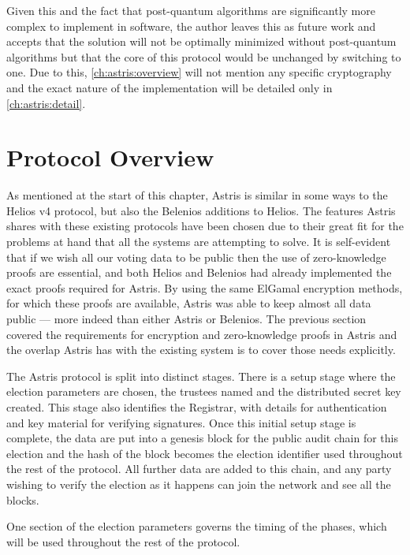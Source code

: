 Given this and the fact that post-quantum algorithms are significantly more complex to implement in software, the author leaves this as future work and accepts that the solution will not be optimally minimized without post-quantum algorithms but that the core of this protocol would be unchanged by switching to one. Due to this, \autoref{ch:astris:overview} will not mention any specific cryptography and the exact nature of the implementation will be detailed only in \autoref{ch:astris:detail}.

\section{Protocol Overview}
\label{ch:astris:overview}

As mentioned at the start of this chapter, Astris is similar in some ways to the Helios v4 protocol, but also the Belenios additions to Helios. The features Astris shares with these existing protocols have been chosen due to their great fit for the problems at hand that all the systems are attempting to solve. It is self-evident that if we wish all our voting data to be public then the use of zero-knowledge proofs are essential, and both Helios and Belenios had already implemented the exact proofs required for Astris. By using the same ElGamal encryption methods, for which these proofs are available, Astris was able to keep almost all data public --- more indeed than either Astris or Belenios. The previous section covered the requirements for encryption and zero-knowledge proofs in Astris and the overlap Astris has with the existing system is to cover those needs explicitly.


The Astris protocol is split into distinct stages. There is a setup stage where the election parameters are chosen, the trustees named and the distributed secret key created. This stage also identifies the Registrar, with details for authentication and key material for verifying signatures. Once this initial setup stage is complete, the data are put into a genesis block for the public audit chain for this election and the hash of the block becomes the election identifier used throughout the rest of the protocol. All further data are added to this chain, and any party wishing to verify the election as it happens can join the network and see all the blocks.

One section of the election parameters governs the timing of the phases, which will be used throughout the rest of the protocol.

